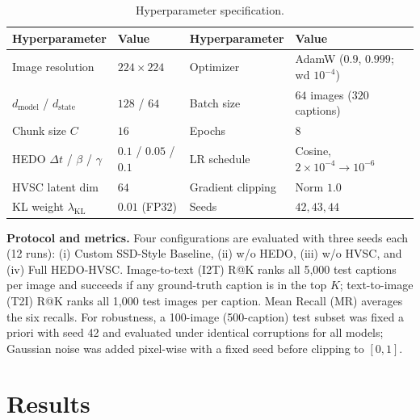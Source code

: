 \documentclass[runningheads,a4paper]{llncs}
\begin{document}
\begin{table}[t]
\centering
\caption{Hyperparameter specification.}
\label{tab:hyperparameters}
\scriptsize
\setlength{\tabcolsep}{4pt}
\begin{tabular}{@{}ll|ll@{}}
\toprule
\textbf{Hyperparameter} & \textbf{Value} & \textbf{Hyperparameter} & \textbf{Value} \\
\midrule
Image resolution & $224 \times 224$ & Optimizer & AdamW ($0.9$, $0.999$; wd $10^{-4}$) \\
$d_{\text{model}}$ / $d_{\text{state}}$ & $128$ / $64$ & Batch size & $64$ images ($320$ captions) \\
Chunk size $C$ & $16$ & Epochs & $8$ \\
HEDO $\Delta t$ / $\beta$ / $\gamma$ & $0.1$ / $0.05$ / $0.1$ & LR schedule & Cosine, $2 \times 10^{-4} \to 10^{-6}$ \\
HVSC latent dim & $64$ & Gradient clipping & Norm $1.0$ \\
KL weight $\lambda_{\text{KL}}$ & $0.01$ (FP32) & Seeds & $42, 43, 44$ \\
\bottomrule
\end{tabular}
\end{table}

\textbf{Protocol and metrics.} Four configurations are evaluated with three seeds each (12 runs): (i) Custom SSD-Style Baseline, (ii) w/o HEDO, (iii) w/o HVSC, and (iv) Full HEDO-HVSC. Image-to-text (I2T) R@K ranks all 5,000 test captions per image and succeeds if any ground-truth caption is in the top $K$; text-to-image (T2I) R@K ranks all 1,000 test images per caption. Mean Recall (MR) averages the six recalls. For robustness, a 100-image (500-caption) test subset was fixed a priori with seed 42 and evaluated under identical corruptions for all models; Gaussian noise was added pixel-wise with a fixed seed before clipping to $[0, 1]$.

\section{Results}
\label{sec:results}
\end{document}
